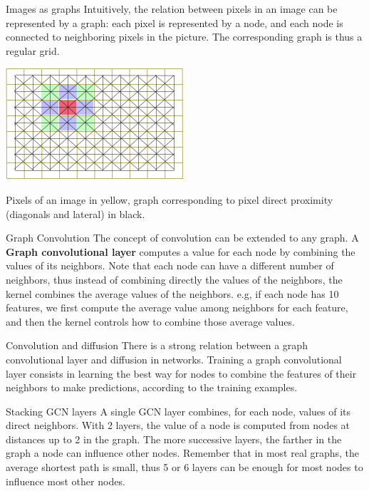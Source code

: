 \documentclass[a4paper,11pt]{book}
\begin{document}
\begin{textbox}{Images as graphs}
Intuitively, the relation between pixels in an image can be represented by a graph: each pixel is represented by a node, and each node is connected to neighboring pixels in the picture. The corresponding graph is thus a regular grid.

\centering
\includegraphics[width=0.5\linewidth]{pics/picture_graph.png}

Pixels of an image in yellow, graph corresponding to pixel direct proximity (diagonals and lateral) in black.
\end{textbox}



\begin{textbox}{Graph Convolution}
The concept of convolution can be extended to any graph. A \textbf{Graph convolutional layer} computes a value for each node by combining the values of its neighbors. Note that each node can have a different number of neighbors, thus instead of combining directly the values of the neighbors, the kernel combines the average values of the neighbors. e.g, if each node has 10 features, we first compute the average value among neighbors for each feature, and then the kernel controls how to combine those average values.


\end{textbox}



\begin{textbox}{Convolution and diffusion}
There is a strong relation between a graph convolutional layer and diffusion in networks. Training a graph convolutional layer consists in learning the best way for nodes to combine the features of their neighbors to make predictions, according to the training examples.
\end{textbox}


\begin{textbox}{Stacking GCN layers}
A single GCN layer combines, for each node, values of its direct neighbors. With 2 layers, the value of a node is computed from nodes at distances up to 2 in the graph. The more successive layers, the farther in the graph a node can influence other nodes. Remember that in most real graphs, the average shortest path is small, thus 5 or 6 layers can be enough for most nodes to influence most other nodes.
\end{textbox}
\end{document}
